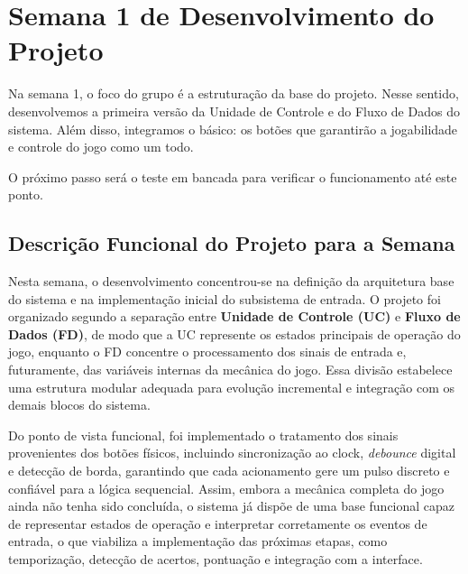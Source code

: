 \documentclass[a4paper,12pt,twoside]{article}
\begin{document}
\section{Semana 1 de Desenvolvimento do
Projeto}\label{semana-1-de-desenvolvimento-do-projeto}
Na semana 1, o foco do grupo é a estruturação da base do projeto. Nesse sentido, desenvolvemos a primeira versão da Unidade de Controle e do Fluxo de Dados do sistema. Além disso, integramos o básico: os botões que garantirão a jogabilidade e controle do jogo como um todo.

O próximo passo será o teste em bancada para verificar o funcionamento até este ponto.

\subsection{Descrição Funcional do Projeto para a
Semana}\label{descriuxe7uxe3o-funcional-do-projeto-para-a-semana}

Nesta semana, o desenvolvimento concentrou-se na definição da arquitetura base do sistema e na implementação inicial do subsistema de entrada. O projeto foi organizado segundo a separação entre \textbf{Unidade de Controle (UC)} e \textbf{Fluxo de Dados (FD)}, de modo que a UC represente os estados principais de operação do jogo, enquanto o FD concentre o processamento dos sinais de entrada e, futuramente, das variáveis internas da mecânica do jogo. Essa divisão estabelece uma estrutura modular adequada para evolução incremental e integração com os demais blocos do sistema.

Do ponto de vista funcional, foi implementado o tratamento dos sinais provenientes dos botões físicos, incluindo sincronização ao clock, \emph{debounce} digital e detecção de borda, garantindo que cada acionamento gere um pulso discreto e confiável para a lógica sequencial. Assim, embora a mecânica completa do jogo ainda não tenha sido concluída, o sistema já dispõe de uma base funcional capaz de representar estados de operação e interpretar corretamente os eventos de entrada, o que viabiliza a implementação das próximas etapas, como temporização, detecção de acertos, pontuação e integração com a interface.
\end{document}
